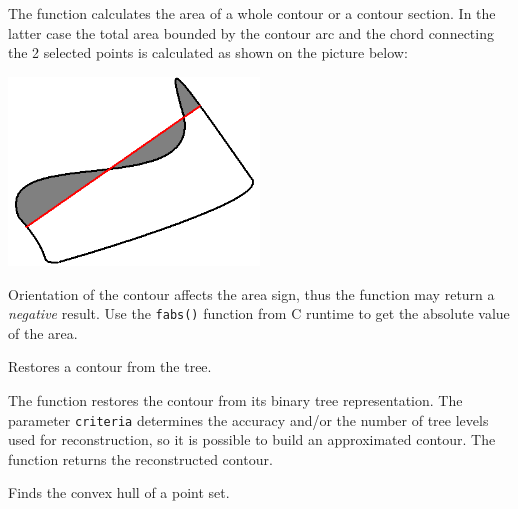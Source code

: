 \begin{description}
\end{description}

The function calculates the area of a whole contour
or a contour section. In the latter case the total area bounded by the
contour arc and the chord connecting the 2 selected points is calculated
as shown on the picture below:

\includegraphics[width=0.5\textwidth]{pics/contoursecarea.png}

Orientation of the contour affects the area sign, thus the function may return a \emph{negative} result. Use the \texttt{fabs()} function from C runtime to get the absolute value of the area.

Restores a contour from the tree.


\begin{description}
\end{description}

The function restores the contour from its binary tree representation. The parameter \texttt{criteria} determines the accuracy and/or the number of tree levels used for reconstruction, so it is possible to build an approximated contour. The function returns the reconstructed contour.

Finds the convex hull of a point set.

